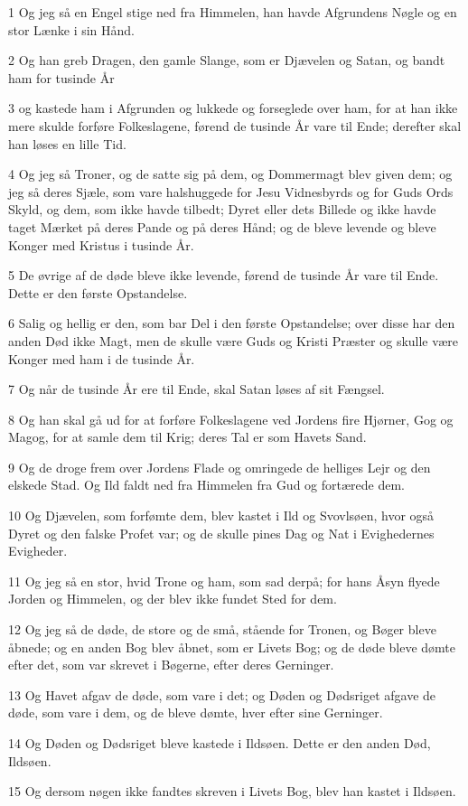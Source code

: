 \par 1 Og jeg så en Engel stige ned fra Himmelen, han havde Afgrundens Nøgle og en stor Lænke i sin Hånd.
\par 2 Og han greb Dragen, den gamle Slange, som er Djævelen og Satan, og bandt ham for tusinde År
\par 3 og kastede ham i Afgrunden og lukkede og forseglede over ham, for at han ikke mere skulde forføre Folkeslagene, førend de tusinde År vare til Ende; derefter skal han løses en lille Tid.
\par 4 Og jeg så Troner, og de satte sig på dem, og Dommermagt blev given dem; og jeg så deres Sjæle, som vare halshuggede for Jesu Vidnesbyrds og for Guds Ords Skyld, og dem, som ikke havde tilbedt; Dyret eller dets Billede og ikke havde taget Mærket på deres Pande og på deres Hånd; og de bleve levende og bleve Konger med Kristus i tusinde År.
\par 5 De øvrige af de døde bleve ikke levende, førend de tusinde År vare til Ende. Dette er den første Opstandelse.
\par 6 Salig og hellig er den, som bar Del i den første Opstandelse; over disse har den anden Død ikke Magt, men de skulle være Guds og Kristi Præster og skulle være Konger med ham i de tusinde År.
\par 7 Og når de tusinde År ere til Ende, skal Satan løses af sit Fængsel.
\par 8 Og han skal gå ud for at forføre Folkeslagene ved Jordens fire Hjørner, Gog og Magog, for at samle dem til Krig; deres Tal er som Havets Sand.
\par 9 Og de droge frem over Jordens Flade og omringede de helliges Lejr og den elskede Stad. Og Ild faldt ned fra Himmelen fra Gud og fortærede dem.
\par 10 Og Djævelen, som forfømte dem, blev kastet i Ild og Svovlsøen, hvor også Dyret og den falske Profet var; og de skulle pines Dag og Nat i Evighedernes Evigheder.
\par 11 Og jeg så en stor, hvid Trone og ham, som sad derpå; for hans Åsyn flyede Jorden og Himmelen, og der blev ikke fundet Sted for dem.
\par 12 Og jeg så de døde, de store og de små, stående for Tronen, og Bøger bleve åbnede; og en anden Bog blev åbnet, som er Livets Bog; og de døde bleve dømte efter det, som var skrevet i Bøgerne, efter deres Gerninger.
\par 13 Og Havet afgav de døde, som vare i det; og Døden og Dødsriget afgave de døde, som vare i dem, og de bleve dømte, hver efter sine Gerninger.
\par 14 Og Døden og Dødsriget bleve kastede i Ildsøen. Dette er den anden Død, Ildsøen.
\par 15 Og dersom nøgen ikke fandtes skreven i Livets Bog, blev han kastet i Ildsøen.

